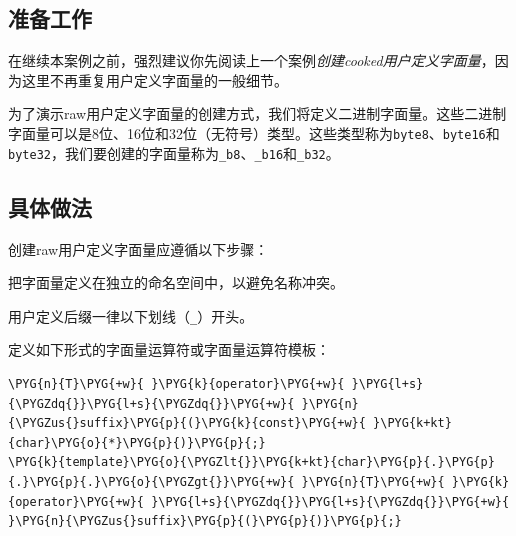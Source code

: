
\subsection{准备工作}



在继续本案例之前，强烈建议你先阅读上一个案例\textit{创建cooked用户定义字面量}，因为这里不再重复用户定义字面量的一般细节。



为了演示raw用户定义字面量的创建方式，我们将定义二进制字面量。这些二进制字面量可以是8位、16位和32位（无符号）类型。这些类型称为\texttt{byte8}、\texttt{byte16}和\texttt{byte32}，我们要创建的字面量称为\texttt{\_\allowbreak{}b8}、\texttt{\_\allowbreak{}b16}和\texttt{\_\allowbreak{}b32}。



\subsection{具体做法}



创建raw用户定义字面量应遵循以下步骤：



把字面量定义在独立的命名空间中，以避免名称冲突。



用户定义后缀一律以下划线（\texttt{\_}）开头。



定义如下形式的字面量运算符或字面量运算符模板：



\begin{codeblockbg}
\begin{Verbatim}[commandchars=\\\{\},breaklines=true,breakanywhere=true,fontsize=\codefont,xleftmargin=17bp]
\PYG{n}{T}\PYG{+w}{ }\PYG{k}{operator}\PYG{+w}{ }\PYG{l+s}{\PYGZdq{}}\PYG{l+s}{\PYGZdq{}}\PYG{+w}{ }\PYG{n}{\PYGZus{}suffix}\PYG{p}{(}\PYG{k}{const}\PYG{+w}{ }\PYG{k+kt}{char}\PYG{o}{*}\PYG{p}{)}\PYG{p}{;}
\PYG{k}{template}\PYG{o}{\PYGZlt{}}\PYG{k+kt}{char}\PYG{p}{.}\PYG{p}{.}\PYG{p}{.}\PYG{o}{\PYGZgt{}}\PYG{+w}{ }\PYG{n}{T}\PYG{+w}{ }\PYG{k}{operator}\PYG{+w}{ }\PYG{l+s}{\PYGZdq{}}\PYG{l+s}{\PYGZdq{}}\PYG{+w}{ }\PYG{n}{\PYGZus{}suffix}\PYG{p}{(}\PYG{p}{)}\PYG{p}{;}
\end{Verbatim}
\end{codeblockbg}


